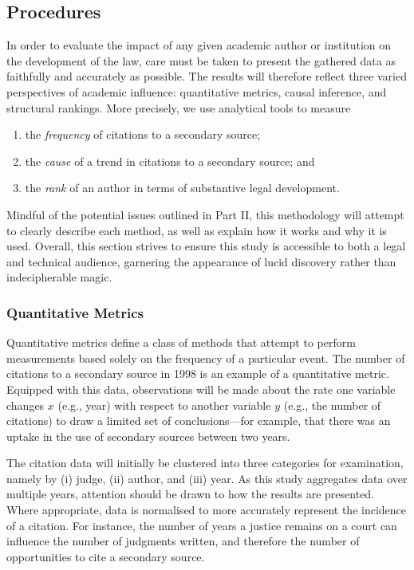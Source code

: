 
\let\xn\xnote
\subsection{Procedures}

In order to evaluate the impact of any given academic author or institution on the development of the law, care must be taken to present the gathered data as faithfully and accurately as possible.\xn{3b-0} The results will therefore reflect three varied perspectives of academic influence: quantitative metrics, causal inference, and structural rankings. More precisely, we use analytical tools to measure
\begin{enumerate}
    \item the \emph{frequency} of citations to a secondary source;
    \item the \emph{cause} of a trend in citations to a secondary source; and
    \item the \emph{rank} of an author in terms of substantive legal development.
\end{enumerate}
Mindful of the potential issues outlined in Part II, this methodology will attempt to clearly describe each method, as well as explain how it works and why it is used. Overall, this section strives to ensure this study is accessible to both a legal and technical audience, garnering the appearance of lucid discovery rather than indecipherable magic.

\subsubsection{Quantitative Metrics}
Quantitative metrics define a class of methods that attempt to perform measurements based solely on the frequency of a particular event.\xn{3b-4} The number of citations to a secondary source in 1998 is an example of a quantitative metric. Equipped with this data, observations will be made about the rate one variable changes $x$ (e.g., year) with respect to another variable $y$ (e.g., the number of citations) to draw a limited set of conclusions\xn{3b-5}---for example, that there was an uptake in the use of secondary sources between two years.

The citation data will initially be clustered into three categories for examination, namely by (i) judge, (ii) author, and (iii) year. As this study aggregates data over multiple years, attention should be drawn to how the results are presented. Where appropriate, data is normalised to more accurately represent the incidence of a citation. For instance, the number of years a justice remains on a court can influence the number of judgments written, and therefore the number of opportunities to cite a secondary source.

